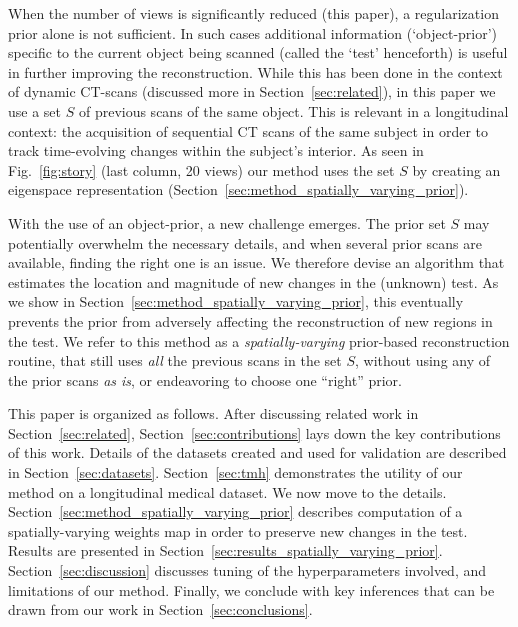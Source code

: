 \documentclass[journal]{IEEEtran}
\begin{document}
 When the number of views is significantly reduced (this paper), a
 regularization prior alone is not sufficient.  In such cases
 additional information (`object-prior') specific to the current
 object being scanned (called the `test' henceforth) is useful in
 further improving the reconstruction.  While this has been done in
 the context of dynamic CT-scans (discussed more in
 Section~\ref{sec:related}), in this paper we use a set $S$ of
 previous scans of the same object. This is relevant in a longitudinal
 context: the acquisition of sequential CT scans of the same subject
 in order to track time-evolving changes within the subject's
 interior. As seen in Fig.~\ref{fig:story} (last column, 20 views) our
 method uses the set $S$ by creating an eigenspace representation
 (Section~\ref{sec:method_spatially_varying_prior}).

 With the use of an object-prior, a new challenge emerges. The prior
 set $S$ may potentially overwhelm the necessary details, and when
 several prior scans are available, finding the right one is an
 issue. We therefore devise an algorithm that estimates the location
 and magnitude of new changes in the (unknown) test. As we show in
 Section~\ref{sec:method_spatially_varying_prior}, this eventually
 prevents the prior from adversely affecting the reconstruction of new
 regions in the test. We refer to this method as a
 \textit{spatially-varying} prior-based reconstruction routine, that
 still uses \textit{all} the previous scans in the set $S$, without
 using any of the prior scans \textit{as is}, or endeavoring to choose
 one ``right'' prior.

 This paper is organized as follows. After discussing related work in
 Section~\ref{sec:related}, Section~\ref{sec:contributions} lays down
 the key contributions of this work. Details of the datasets created
 and used for validation are described in
 Section~\ref{sec:datasets}. Section~\ref{sec:tmh} demonstrates the
 utility of our method on a longitudinal medical dataset. We now move
 to the details. Section~\ref{sec:method_spatially_varying_prior}
 describes computation of a spatially-varying weights map in order to
 preserve new changes in the test.  Results are presented in
 Section~\ref{sec:results_spatially_varying_prior}. Section~\ref{sec:discussion}
 discusses tuning of the hyperparameters involved, and limitations of
 our method. Finally, we conclude with key inferences that can be
 drawn from our work in Section~\ref{sec:conclusions}.
 
\end{document}
